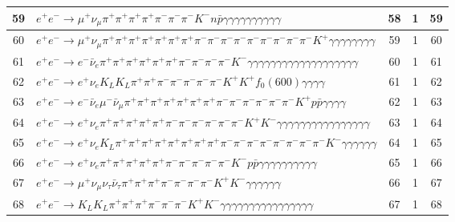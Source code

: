 \documentclass[landscape]{article}
\begin{document}
\begin{table}[htbp!]
\begin{tabular}{|c|>{\centering}p{18cm}|c|c|c|}
\hline
59 & $ e^{+} e^{-} \rightarrow \mu^{+} \nu_{\mu} \pi^{+} \pi^{+} \pi^{+} \pi^{+} \pi^{-} \pi^{-} \pi^{-} K^{-} n \bar{p} \gamma \gamma \gamma \gamma \gamma \gamma \gamma \gamma \gamma \gamma $ & 58 & 1 & 59 \\
\hline
60 & $ e^{+} e^{-} \rightarrow \mu^{+} \nu_{\mu} \pi^{+} \pi^{+} \pi^{+} \pi^{+} \pi^{+} \pi^{+} \pi^{+} \pi^{-} \pi^{-} \pi^{-} \pi^{-} \pi^{-} \pi^{-} \pi^{-} \pi^{-} \pi^{-} K^{+} \gamma \gamma \gamma \gamma \gamma \gamma \gamma \gamma $ & 59 & 1 & 60 \\
\hline
61 & $ e^{+} e^{-} \rightarrow e^{-} \bar{\nu}_{e} \pi^{+} \pi^{+} \pi^{+} \pi^{+} \pi^{+} \pi^{+} \pi^{-} \pi^{-} \pi^{-} \pi^{-} K^{-} \gamma \gamma \gamma \gamma \gamma \gamma \gamma \gamma \gamma \gamma \gamma \gamma \gamma \gamma \gamma \gamma \gamma \gamma \gamma $ & 60 & 1 & 61 \\
\hline
62 & $ e^{+} e^{-} \rightarrow e^{+} \nu_{e} K_{L} K_{L} \pi^{+} \pi^{+} \pi^{-} \pi^{-} \pi^{-} \pi^{-} \pi^{-} K^{+} K^{+} f_{0}(600) \gamma \gamma \gamma \gamma $ & 61 & 1 & 62 \\
\hline
63 & $ e^{+} e^{-} \rightarrow e^{-} \bar{\nu}_{e} \mu^{-} \bar{\nu}_{\mu} \pi^{+} \pi^{+} \pi^{+} \pi^{+} \pi^{+} \pi^{+} \pi^{+} \pi^{-} \pi^{-} \pi^{-} \pi^{-} \pi^{-} \pi^{-} K^{+} p \bar{p} \gamma \gamma \gamma \gamma $ & 62 & 1 & 63 \\
\hline
64 & $ e^{+} e^{-} \rightarrow e^{+} \nu_{e} \pi^{+} \pi^{+} \pi^{+} \pi^{+} \pi^{+} \pi^{-} \pi^{-} \pi^{-} \pi^{-} \pi^{-} \pi^{-} K^{+} K^{-} \gamma \gamma \gamma \gamma \gamma \gamma \gamma \gamma \gamma \gamma \gamma \gamma \gamma \gamma \gamma \gamma $ & 63 & 1 & 64 \\
\hline
65 & $ e^{+} e^{-} \rightarrow e^{+} \nu_{e} K_{L} \pi^{+} \pi^{+} \pi^{+} \pi^{+} \pi^{+} \pi^{+} \pi^{+} \pi^{+} \pi^{-} \pi^{-} \pi^{-} \pi^{-} \pi^{-} \pi^{-} \pi^{-} \pi^{-} K^{-} \gamma \gamma \gamma \gamma \gamma \gamma $ & 64 & 1 & 65 \\
\hline
66 & $ e^{+} e^{-} \rightarrow e^{+} \nu_{e} \pi^{+} \pi^{+} \pi^{+} \pi^{+} \pi^{+} \pi^{-} \pi^{-} \pi^{-} \pi^{-} \pi^{-} K^{-} p \bar{p} \gamma \gamma \gamma \gamma \gamma \gamma \gamma \gamma \gamma \gamma $ & 65 & 1 & 66 \\
\hline
67 & $ e^{+} e^{-} \rightarrow \mu^{+} \nu_{\mu} \nu_{\tau} \bar{\nu}_{\tau} \pi^{+} \pi^{+} \pi^{+} \pi^{-} \pi^{-} \pi^{-} \pi^{-} K^{+} K^{-} \gamma \gamma \gamma \gamma \gamma \gamma $ & 66 & 1 & 67 \\
\hline
68 & $ e^{+} e^{-} \rightarrow K_{L} K_{L} \pi^{+} \pi^{+} \pi^{+} \pi^{-} \pi^{-} \pi^{-} K^{+} K^{-} \gamma \gamma \gamma \gamma \gamma \gamma \gamma \gamma \gamma \gamma \gamma \gamma \gamma \gamma \gamma \gamma $ & 67 & 1 & 68 \\

\end{tabular}
\end{table}
\end{document}
